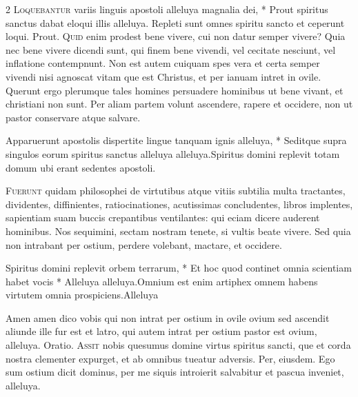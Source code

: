 \begin{multicols*}{2}
\lettrine[lines=2]{\zallmancaps \color{Red} L}{oquebantur} \hypertarget{loquebantur-variis}{\label{loquebantur-variis}} variis linguis apostoli alleluya magnalia dei, * Prout spiritus sanctus dabat eloqui illis alleluya. \V Repleti sunt omnes spiritu sancto et ceperunt loqui. Prout.
\lettrine[lines=2]{\zallmancaps \color{Blue} Q}{uid} enim prodest bene vivere, cui non datur semper vivere? Quia nec bene vivere dicendi sunt, qui finem bene vivendi, vel cecitate nesciunt, vel inflatione contempnunt. Non
est autem cuiquam spes vera et certa semper vivendi nisi agnoscat vitam que est Christus, et per ianuam intret in ovile. Querunt ergo plerumque tales homines persuadere hominibus ut bene vivant, et christiani non sunt. Per aliam partem volunt ascendere, rapere et occidere, non ut pastor conservare atque salvare.
\begin{responsory}
{Apparuerunt apostolis dispertite lingue tanquam ignis alleluya, * Seditque supra singulos eorum spiritus sanctus alleluya alleluya.}{Spiritus domini replevit totam domum ubi erant sedentes apostoli.}
\end{responsory}%
\lettrine[lines=2]{\zallmancaps \color{Red} F}{uerunt} quidam philosophei de virtutibus atque vitiis subtilia multa tractantes, dividentes, diffinientes, ratiocinationes, acutissimas concludentes, libros implentes, sapientiam suam buccis crepantibus ventilantes: qui eciam dicere auderent hominibus. Nos sequimini, sectam nostram tenete, si vultis beate vivere. Sed quia non intrabant per ostium, perdere volebant, mactare, et occidere.
\begin{responsory-final}
{Spiritus domini replevit orbem terrarum, * Et hoc quod continet omnia scientiam habet vocis * Alleluya alleluya.}{Omnium est enim artiphex omnem habens virtutem omnia prospiciens.}{Alleluya}
\end{responsory-final}%
 Amen amen dico vobis qui non intrat per ostium in ovile ovium sed ascendit aliunde ille fur est et latro, qui autem intrat per ostium pastor est ovium, alleluya. {\color{Red} Oratio.}
\lettrine[lines=2]{\zallmancaps \color{Blue} A}{ssit} nobis quesumus domine virtus spiritus sancti, que et corda nostra clementer expurget, et ab omnibus tueatur adversis. Per, eiusdem.
 Ego sum ostium dicit dominus, per me siquis introierit salvabitur et pascua inveniet, alleluya.

\end{multicols*}
